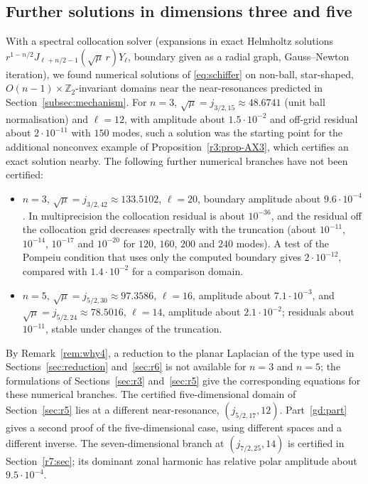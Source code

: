 \documentclass[11pt]{amsart}
\theoremstyle{definition}
\theoremstyle{remark}
\numberwithin{equation}{section}
\newcommand{\Z}{\mathbb{Z}}
\begin{document}
\subsection{Further solutions in dimensions three and five}\label{subsec:numerics}
With a spectral collocation solver (expansions in exact Helmholtz solutions $r^{1-n/2}J_{\ell+n/2-1}(\sqrt\mu\,r)Y_\ell$, boundary given as a radial graph, Gauss--Newton iteration), we found numerical solutions of \eqref{eq:schiffer} on non-ball, star-shaped, $O(n-1)\times\Z_2$-invariant domains near the near-resonances predicted in Section~\ref{subsec:mechanism}. For $n=3$, $\sqrt\mu=j_{3/2,15}\approx48.6741$ (unit ball normalisation) and $\ell=12$, with amplitude about $1.5\cdot10^{-2}$ and off-grid residual about $2\cdot10^{-11}$ with $150$ modes, such a solution was the starting point for the additional nonconvex example of Proposition~\ref{r3:prop-AX3}, which certifies an exact solution nearby. The following further numerical branches have not been certified:
\begin{itemize}
\item $n=3$, $\sqrt\mu=j_{3/2,42}\approx133.5102$, $\ell=20$, boundary amplitude about $9.6\cdot10^{-4}$. In multiprecision the collocation residual is about $10^{-36}$, and the residual off the collocation grid decreases spectrally with the truncation (about $10^{-11}$, $10^{-14}$, $10^{-17}$ and $10^{-20}$ for $120$, $160$, $200$ and $240$ modes). A test of the Pompeiu condition that uses only the computed boundary gives $2\cdot10^{-12}$, compared with $1.4\cdot10^{-2}$ for a comparison domain.
\item $n=5$, $\sqrt\mu=j_{5/2,30}\approx97.3586$, $\ell=16$, amplitude about $7.1\cdot10^{-3}$, and $\sqrt\mu=j_{5/2,24}\approx78.5016$, $\ell=14$, amplitude about $2.1\cdot10^{-2}$; residuals about $10^{-11}$, stable under changes of the truncation.
\end{itemize}
By Remark~\ref{rem:why4}, a reduction to the planar Laplacian of the type used in Sections~\ref{sec:reduction} and~\ref{sec:r6} is not available for $n=3$ and $n=5$; the formulations of Sections~\ref{sec:r3} and~\ref{sec:r5} give the corresponding equations for these numerical branches. The certified five-dimensional domain of Section~\ref{sec:r5} lies at a different near-resonance, $(j_{5/2,17},12)$. Part~\ref{gd:part} gives a second proof of the five-dimensional case, using different spaces and a different inverse. The seven-dimensional branch at $(j_{7/2,25},14)$ is certified in Section~\ref{r7:sec}; its dominant zonal harmonic has relative polar amplitude about $9.5\cdot10^{-4}$.
\end{document}

